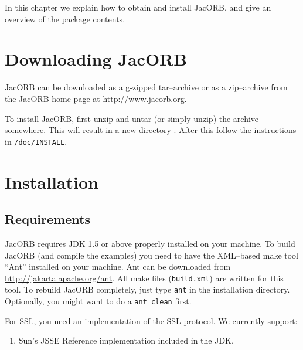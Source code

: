 
In this chapter  we explain how to obtain and  install JacORB, and give
an overview of the package contents.

\section{Downloading JacORB}


JacORB can be downloaded as a g-zipped tar--archive or as a zip--archive
from the  JacORB home page  at
\href{http://www.jacorb.org}{http://www.jacorb.org}.

To install JacORB, first unzip  and untar (or simply unzip) the archive
somewhere.  This will result  in a new directory {\tt \JacORBDir}.
After this follow the instructions in {\tt \JacORBDir/doc/INSTALL}.

\section{Installation}
\label{Sec_installation}

\subsection{Requirements}

JacORB requires JDK 1.5 or above properly installed on your machine.  To build
JacORB (and compile the examples) you need to have the XML--based make tool
``Ant'' installed on your machine.  Ant can be downloaded from
\href{http://jakarta.apache.org/ant}{http://jakarta.apache.org/ant}. All make
files ({\tt build.xml}) are written for this tool. To rebuild JacORB
completely, just type {\tt ant} in the installation directory.  Optionally,
you might want to do a {\tt ant clean} first.

For SSL, you need an implementation of the SSL protocol. We currently support:

\begin{enumerate}
\item Sun's JSSE Reference implementation included in the JDK.
\end{enumerate}


